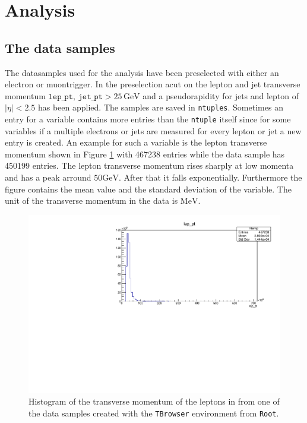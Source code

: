 \section{Analysis}\label{sec:analysis}

\subsection{The data samples}
The datasamples used for the analysis have been preselected with either an electron or muontrigger. In the preselection acut on the lepton and jet transverse momentum 
$\texttt{lep\_pt}, \, \texttt{jet\_pt} > 25 \, \si{\giga\eV}$ and a pseudorapidity for jets and lepton of $|\eta| <2.5$ has been applied. 
The samples are saved in \texttt{ntuples}. Sometimes an entry for a variable contains more entries than the \texttt{ntuple} itself since for some variables if a multiple 
electrons or jets are measured for every lepton or jet a new entry is created. An example for such a variable is the lepton transverse momentum 
shown in Figure \ref{fig:unselected_pt} with 467238 entries while the data sample has 450199 entries.  
The lepton transverse momentum rises sharply at low momenta and has a peak arround $50  \si{\giga\eV}$. After that it falls exponentially.
Furthermore the figure contains the mean value and the standard deviation of the variable. The unit of the transverse momentum in the data is $\si{\mega\eV}$.

\begin{figure}[tb]
    \centering
    \includegraphics[width=.9\textwidth]{plots/TBrowser_hist.pdf}
    \caption{Histogram of the transverse momentum of the leptons in from one of the data samples created with the \texttt{TBrowser} environment from \texttt{Root}.}
    \label{fig:unselected_pt}
  \end{figure}

